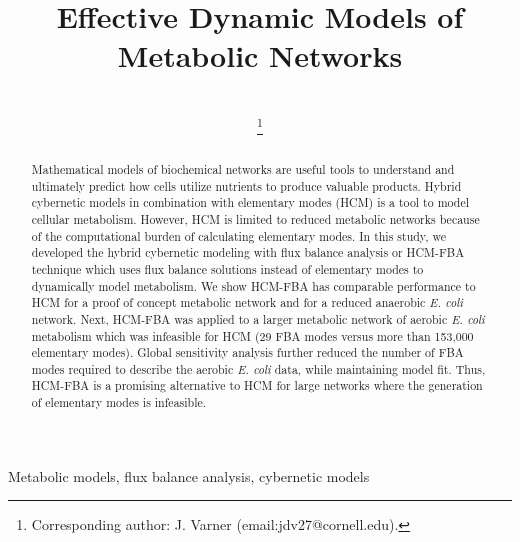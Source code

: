 \documentclass[10pt,twocolumn,twoside,final]{IEEEtran}
\begin{document}
\title{Effective Dynamic Models of Metabolic Networks}


\author{\\
\thanks{Corresponding author: J. Varner (email:jdv27@cornell.edu).}}

\maketitle

\begin{abstract}
Mathematical models of biochemical networks are useful tools to understand and ultimately predict how cells utilize nutrients to produce valuable products.
Hybrid cybernetic models in combination with elementary modes (HCM) is a tool to model cellular metabolism.
However, HCM is limited to reduced metabolic networks because of the computational burden of calculating elementary modes.
In this study, we developed the hybrid cybernetic modeling with flux balance analysis or HCM-FBA technique which uses flux balance solutions instead of elementary modes
to dynamically model metabolism.
We show HCM-FBA has comparable performance to HCM for a proof of concept metabolic network and for a reduced anaerobic \textit{E. coli} network.
Next, HCM-FBA was applied to a larger metabolic network of aerobic \textit{E. coli} metabolism which was infeasible for HCM (29 FBA modes versus more than 153,000 elementary modes).
Global sensitivity analysis further reduced the number of FBA modes required to describe the aerobic \textit{E. coli} data, while maintaining model fit.
Thus, HCM-FBA is a promising alternative to HCM for large networks where the generation of elementary modes is infeasible.

\end{abstract}


\begin{IEEEkeywords}
Metabolic models, flux balance analysis, cybernetic models
\end{IEEEkeywords}
\end{document}
